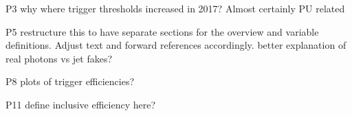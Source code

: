 P3
why where trigger thresholds increased in 2017? Almost certainly PU related

P5
restructure this to have separate sections for the overview and variable definitions. Adjust text 
and forward references accordingly.
better explanation of real photons vs jet fakes?

P8
plots of trigger efficiencies?

P11 
define inclusive efficiency here?
